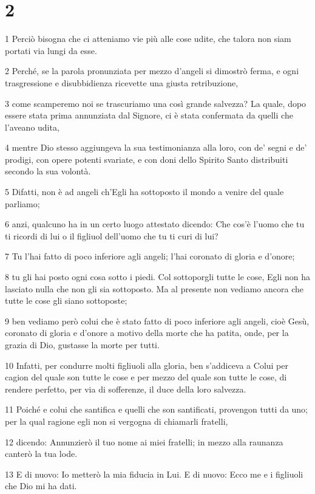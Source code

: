 \chapter{2}

\par 1 Perciò bisogna che ci atteniamo vie più alle cose udite, che talora non siam portati via lungi da esse.
\par 2 Perché, se la parola pronunziata per mezzo d'angeli si dimostrò ferma, e ogni trasgressione e disubbidienza ricevette una giusta retribuzione,
\par 3 come scamperemo noi se trascuriamo una così grande salvezza? La quale, dopo essere stata prima annunziata dal Signore, ci è stata confermata da quelli che l'aveano udita,
\par 4 mentre Dio stesso aggiungeva la sua testimonianza alla loro, con de' segni e de' prodigi, con opere potenti svariate, e con doni dello Spirito Santo distribuiti secondo la sua volontà.
\par 5 Difatti, non è ad angeli ch'Egli ha sottoposto il mondo a venire del quale parliamo;
\par 6 anzi, qualcuno ha in un certo luogo attestato dicendo: Che cos'è l'uomo che tu ti ricordi di lui o il figliuol dell'uomo che tu ti curi di lui?
\par 7 Tu l'hai fatto di poco inferiore agli angeli; l'hai coronato di gloria e d'onore;
\par 8 tu gli hai posto ogni cosa sotto i piedi. Col sottoporgli tutte le cose, Egli non ha lasciato nulla che non gli sia sottoposto. Ma al presente non vediamo ancora che tutte le cose gli siano sottoposte;
\par 9 ben vediamo però colui che è stato fatto di poco inferiore agli angeli, cioè Gesù, coronato di gloria e d'onore a motivo della morte che ha patita, onde, per la grazia di Dio, gustasse la morte per tutti.
\par 10 Infatti, per condurre molti figliuoli alla gloria, ben s'addiceva a Colui per cagion del quale son tutte le cose e per mezzo del quale son tutte le cose, di rendere perfetto, per via di sofferenze, il duce della loro salvezza.
\par 11 Poiché e colui che santifica e quelli che son santificati, provengon tutti da uno; per la qual ragione egli non si vergogna di chiamarli fratelli,
\par 12 dicendo: Annunzierò il tuo nome ai miei fratelli; in mezzo alla raunanza canterò la tua lode.
\par 13 E di nuovo: Io metterò la mia fiducia in Lui. E di nuovo: Ecco me e i figliuoli che Dio mi ha dati.
